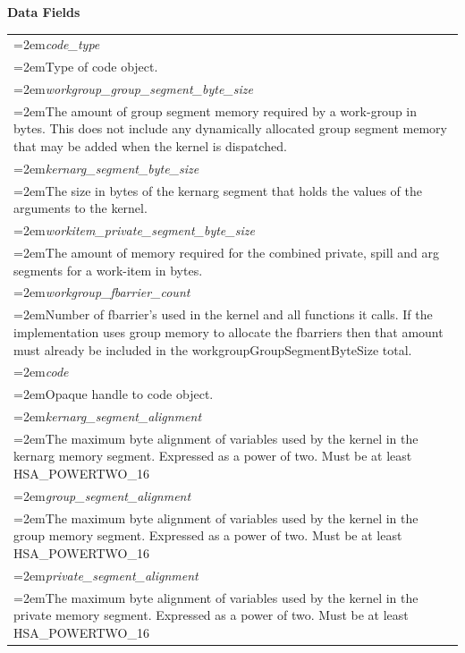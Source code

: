 \documentclass[final]{book}
\newcommand{\reffld}[1]{\textit{#1}}
\begin{document}
\noindent\textbf{Data Fields}\\[-6mm]
\begin{longtable}{@{}>{\hangindent=2em}p{\textwidth}}
\reffld{code_type}\\\hspace{2em}Type of code object.\\[2mm]
\reffld{workgroup_group_segment_byte_size}\\\hspace{2em}The amount of group segment memory required by a work-group in bytes. This does not include any dynamically allocated group segment memory that may be added when the kernel is dispatched.\\[2mm]
\reffld{kernarg_segment_byte_size}\\\hspace{2em}The size in bytes of the kernarg segment that holds the values of the arguments to the kernel.\\[2mm]
\reffld{workitem_private_segment_byte_size}\\\hspace{2em}The amount of memory required for the combined private, spill and arg segments for a work-item in bytes.\\[2mm]
\reffld{workgroup_fbarrier_count}\\\hspace{2em}Number of fbarrier's used in the kernel and all functions it calls. If the implementation uses group memory to allocate the fbarriers then that amount must already be included in the workgroupGroupSegmentByteSize total.\\[2mm]
\reffld{code}\\\hspace{2em}Opaque handle to code object.\\[2mm]
\reffld{kernarg_segment_alignment}\\\hspace{2em}The maximum byte alignment of variables used by the kernel in the kernarg memory segment. Expressed as a power of two. Must be at least HSA_POWERTWO_16\\[2mm]
\reffld{group_segment_alignment}\\\hspace{2em}The maximum byte alignment of variables used by the kernel in the group memory segment. Expressed as a power of two. Must be at least HSA_POWERTWO_16\\[2mm]
\reffld{private_segment_alignment}\\\hspace{2em}The maximum byte alignment of variables used by the kernel in the private memory segment. Expressed as a power of two. Must be at least HSA_POWERTWO_16\\[2mm]

\end{longtable}
\end{document}

